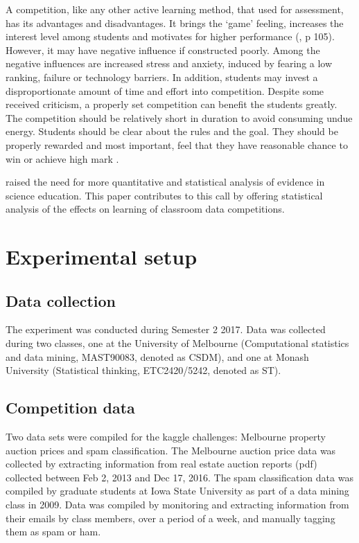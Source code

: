 \documentclass[12pt]{article}
\begin{document}
A competition, like any other active learning method, that used for
assessment, has its advantages and disadvantages. It brings the `game'
feeling, increases the interest level among students and motivates for
higher performance (\citet{Shindler09}, p 105). However, it may have
negative influence if constructed poorly. Among the negative influences
are increased stress and anxiety, induced by fearing a low ranking,
failure or technology barriers. In addition, students may invest a
disproportionate amount of time and effort into competition. Despite
some received criticism, a properly set competition can benefit the
students greatly. The competition should be relatively short in duration
to avoid consuming undue energy. Students should be clear about the
rules and the goal. They should be properly rewarded and most important,
feel that they have reasonable chance to win or achieve high mark
\citep{Shindler09}.

\citet{Shelley08} raised the need for more quantitative and statistical
analysis of evidence in science education. This paper contributes to
this call by offering statistical analysis of the effects on learning of
classroom data competitions.

\section{Experimental setup}\label{experimental-setup}

\subsection{Data collection}\label{data-collection}

The experiment was conducted during Semester 2 2017. Data was collected
during two classes, one at the University of Melbourne (Computational
statistics and data mining, MAST90083, denoted as CSDM), and one at
Monash University (Statistical thinking, ETC2420/5242, denoted as ST).

\subsection{Competition data}\label{competition-data}

Two data sets were compiled for the kaggle challenges: Melbourne
property auction prices and spam classification. The Melbourne auction
price data was collected by extracting information from real estate
auction reports (pdf) collected between Feb 2, 2013 and Dec 17, 2016.
The spam classification data was compiled by graduate students at Iowa
State University as part of a data mining class in 2009. Data was
compiled by monitoring and extracting information from their emails by
class members, over a period of a week, and manually tagging them as
spam or ham.
\end{document}
